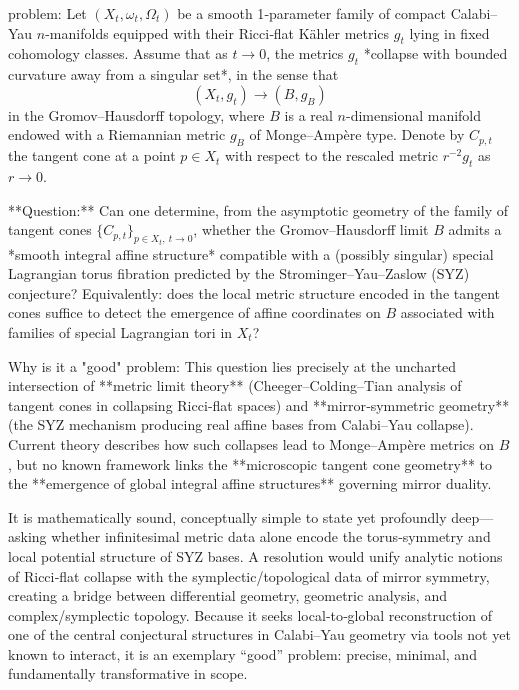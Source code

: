 problem:  
Let \( (X_t, \omega_t, \Omega_t) \) be a smooth 1‑parameter family of compact Calabi–Yau \(n\)-manifolds equipped with their Ricci‑flat Kähler metrics \( g_t \) lying in fixed cohomology classes.  
Assume that as \(t \to 0\), the metrics \(g_t\) *collapse with bounded curvature away from a singular set*, in the sense that  
\[
(X_t, g_t) \longrightarrow (B, g_B)
\]
in the Gromov–Hausdorff topology, where \(B\) is a real \(n\)-dimensional manifold endowed with a Riemannian metric \(g_B\) of Monge–Ampère type.  
Denote by \(C_{p,t}\) the tangent cone at a point \(p \in X_t\) with respect to the rescaled metric \(r^{-2}g_t\) as \(r \to 0\).

**Question:**  
Can one determine, from the asymptotic geometry of the family of tangent cones \(\{ C_{p,t} \}_{p \in X_t,\ t \to 0}\), whether the Gromov–Hausdorff limit \(B\) admits a *smooth integral affine structure* compatible with a (possibly singular) special Lagrangian torus fibration predicted by the Strominger–Yau–Zaslow (SYZ) conjecture?  
Equivalently: does the local metric structure encoded in the tangent cones suffice to detect the emergence of affine coordinates on \(B\) associated with families of special Lagrangian tori in \(X_t\)?

Why is it a "good" problem:  
This question lies precisely at the uncharted intersection of **metric limit theory** (Cheeger–Colding–Tian analysis of tangent cones in collapsing Ricci‑flat spaces) and **mirror‑symmetric geometry** (the SYZ mechanism producing real affine bases from Calabi–Yau collapse). Current theory describes how such collapses lead to Monge–Ampère metrics on \(B\), but no known framework links the **microscopic tangent cone geometry** to the **emergence of global integral affine structures** governing mirror duality.  

It is mathematically sound, conceptually simple to state yet profoundly deep—asking whether infinitesimal metric data alone encode the torus‑symmetry and local potential structure of SYZ bases. A resolution would unify analytic notions of Ricci‑flat collapse with the symplectic/topological data of mirror symmetry, creating a bridge between differential geometry, geometric analysis, and complex/symplectic topology.  
Because it seeks local‑to‑global reconstruction of one of the central conjectural structures in Calabi–Yau geometry via tools not yet known to interact, it is an exemplary “good” problem: precise, minimal, and fundamentally transformative in scope.